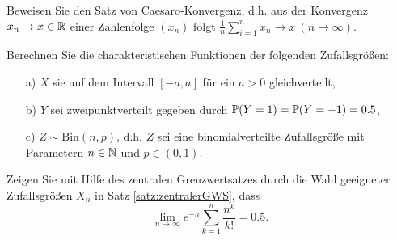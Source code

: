 \begin{aufgabe} 
Beweisen Sie den Satz von Caesaro-Konvergenz, d.h. aus der Konvergenz $x_n\to x\in\R$ einer Zahlenfolge $(x_n)$ folgt
$\tfrac{1}{n}\sum_{i=1}^{n}x_n\to x\ (n\to\infty)$.
\end{aufgabe}

\begin{aufgabe} 
Berechnen Sie die charakteristischen Funktionen der folgenden Zufallsgrößen:
\begin{enumerate}
    \item[a)] $X$ sie auf dem Intervall $[-a,a]$ für ein $a>0$ gleichverteilt,
    \item[b)] $Y$ sei zweipunktverteilt gegeben durch $\P(Y=1)=\P(Y=-1)=0.5$,
    \item[c)] $Z\sim\mathrm{Bin}(n,p)$, d.h. $Z$ sei eine binomialverteilte Zufallsgröße mit Parametern $n\in\N$ und 
    $p\in(0,1)$.
\end{enumerate}
\end{aufgabe}

\begin{aufgabe} 
Zeigen Sie mit Hilfe des zentralen Grenzwertsatzes durch die Wahl geeigneter Zufallsgrößen $X_n$ in Satz 
\ref{satz:zentralerGWS}, dass
\[
    \lim_{n\to\infty} e^{-n}\sum_{k=1}^{n}\dfrac{n^k}{k!} = 0.5.
\]
\end{aufgabe}
